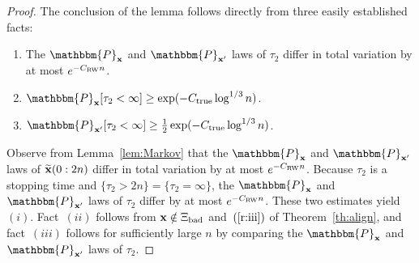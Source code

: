 \documentclass[final,12pt]{colt2018} %
\renewcommand{\P}{\mathbbm{P}}
\newcommand{\1}{\mathbf{1}}
\newcommand{\wt}{\widetilde}
\def\xt{{\wt {\bf x}}}
\def\x{{\bf x}}
\def\ctrue{C_{\rm true}}
\def\crw{C_{\rm RW}}
\def\bad{{\Xi_{\rm bad}}}
\begin{document}
\begin{proof}
	The conclusion of the lemma follows directly from three easily
	established facts:
	\begin{enumerate}[$(i)$]
		\item The $\P_\x$ and $\P_{\x'}$ laws of $\tau_2$ differ in total
		variation by at most $e^{-\crw n}$.
		\item $\P_\x [\tau_2 < \infty] \geq \exp (- \ctrue \log^{1/3} n)$.
		\item $\P_{\x'} [\tau_2 < \infty] \geq \frac{1}{2}
		\exp (- \ctrue \log^{1/3} n)$.
	\end{enumerate}
	Observe from Lemma~\ref{lem:Markov} that the $\P_\x$ and $\P_{\x'}$
	laws of $\xt(0:2n)$ differ in total variation by at most $e^{-\crw n}$.
	Because $\tau_2$ is a stopping time and $\{ \tau_2 > 2n \} =
	\{ \tau_2 = \infty \}$, the $\P_\x$ and $\P_{\x'}$ laws of
	$\tau_2$ differ by at most $e^{-\crw n}$.  These two estimates
	yield~$(i)$.  Fact~$(ii)$ follows from $\x \notin \bad$ and~$(\ref{r:iii})$
	of Theorem~\ref{th:align}, and fact~$(iii)$ follows for sufficiently
	large $n$ by comparing the $\P_\x$ and $\P_{\x'}$ laws of $\tau_2$.
\end{proof}
\end{document}
